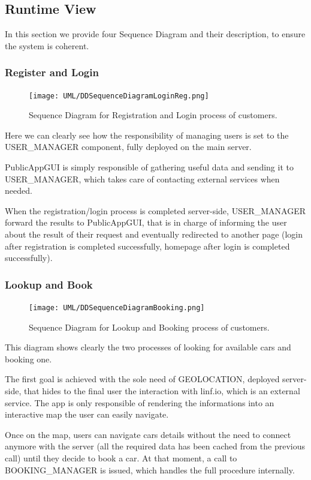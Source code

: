 \documentclass[11pt]{article} %
\begin{document}
\subsection{Runtime View}

In this section we provide four Sequence Diagram and their description, to ensure the system is coherent.

\subsubsection{Register and Login}
\begin{figure}[H]
	\centering
	\texttt{[image: UML/DDSequenceDiagramLoginReg.png]}
	\caption{Sequence Diagram for Registration and Login process of customers.	}
\end{figure}	
Here we can clearly see how the responsibility of managing users is set to the USER\_MANAGER component, fully deployed on the main server.

PublicAppGUI is simply responsible of gathering useful data and sending it to USER\_MANAGER, which takes care of contacting external services when needed. 

When the registration/login process is completed server-side, USER\_MANAGER forward the results to PublicAppGUI, that is in charge of informing the user about the result of their request and eventually redirected to another page (login after registration is completed successfully, homepage after login is completed successfully).

\subsubsection{Lookup and Book}
\begin{figure}[H]
	\centering
	\texttt{[image: UML/DDSequenceDiagramBooking.png]}
	\caption{Sequence Diagram for Lookup and Booking process of customers.}
\end{figure}
This diagram shows clearly the two processes of looking for available cars and booking one.

The first goal is achieved with the sole need of GEOLOCATION, deployed server-side, that hides to the final user the interaction with linf.io, which is an external service. The app is only responsible of rendering the informations into an interactive map the user can easily navigate.

Once on the map, users can navigate cars details without the need to connect anymore with the server (all the required data has been cached from the previous call) until they decide to book a car. At that moment, a call to BOOKING\_MANAGER is issued, which handles the full procedure internally.
\end{document}
